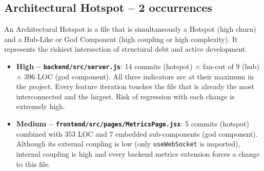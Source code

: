 \subsection*{Architectural Hotspot -- 2 occurrences}

An Architectural Hotspot is a file that is simultaneously a Hotspot (high
churn) and a Hub-Like or God Component (high coupling or high complexity).
It represents the riskiest intersection of structural debt and active
development.

\begin{itemize}
  \item \textbf{High -- \texttt{backend/src/server.js}}: 14 commits (hotspot)
    $\times$ fan-out of 9 (hub) $\times$ 396 LOC (god component). All three
    indicators are at their maximum in the project. Every feature iteration
    touches the file that is already the most interconnected and the largest.
    Risk of regression with each change is extremely high.

  \item \textbf{Medium -- \texttt{frontend/src/pages/MetricsPage.jsx}}: 5
    commits (hotspot) combined with 353 LOC and 7 embedded sub-components
    (god component). Although its external coupling is low (only
    \texttt{useWebSocket} is imported), internal coupling is high and every
    backend metrics extension forces a change to this file.
\end{itemize}
